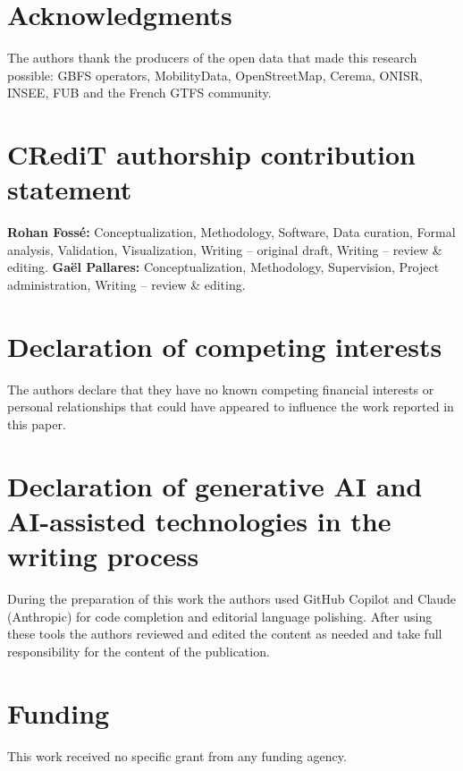 \documentclass[11pt,a4paper]{article}
\newif\ifanonymous
\begin{document}
\section*{Acknowledgments}
The authors thank the producers of the open data that made this
research possible: GBFS operators, MobilityData, OpenStreetMap, Cerema,
ONISR, INSEE, FUB and the French GTFS community.

\section*{CRediT authorship contribution statement}
\ifanonymous
Author contributions are withheld for double-blind review.
\else
\textbf{Rohan Foss\'e:} Conceptualization, Methodology, Software, Data
curation, Formal analysis, Validation, Visualization, Writing -- original
draft, Writing -- review \& editing. \textbf{Ga\"el Pallares:}
Conceptualization, Methodology, Supervision, Project administration,
Writing -- review \& editing.
\fi

\section*{Declaration of competing interests}
The authors declare that they have no known competing financial
interests or personal relationships that could have appeared to
influence the work reported in this paper.

\section*{Declaration of generative AI and AI-assisted technologies in the writing process}
During the preparation of this work the authors used GitHub Copilot
and Claude (Anthropic) for code completion and editorial language
polishing. After using these tools the authors reviewed and edited
the content as needed and take full responsibility for the content
of the publication.

\section*{Funding}
This work received no specific grant from any funding agency.



\end{document}
